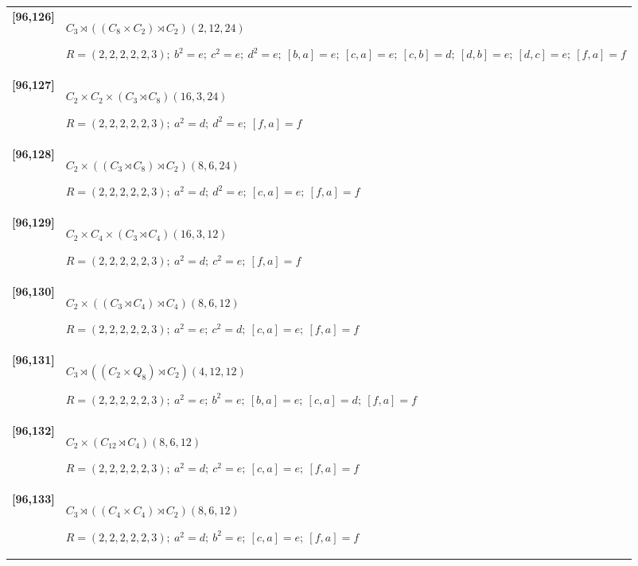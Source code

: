 \documentclass[UTF8,fontset=fandol,11pt,a4paper]{ctexart}
\begin{document}
\begin{longtable}{@{}p{17mm}>{\raggedright\arraybackslash}p{141mm}@{}}
\textbf{[96,126]} & $C_{3}\rtimes ((C_{8}\times C_{2})\rtimes C_{2})$\quad $(2,12,24)$\par\(R=(2,2,2,2,2,3);\allowbreak\ b^{2}=e;\allowbreak\ c^{2}=e;\allowbreak\ d^{2}=e;\allowbreak\ [b,a]=e;\allowbreak\ [c,a]=e;\allowbreak\ [c,b]=d;\allowbreak\ [d,b]=e;\allowbreak\ [d,c]=e;\allowbreak\ [f,a]=f\)\\[3pt]

\textbf{[96,127]} & $C_{2}\times C_{2}\times (C_{3}\rtimes C_{8})$\quad $(16,3,24)$\par\(R=(2,2,2,2,2,3);\allowbreak\ a^{2}=d;\allowbreak\ d^{2}=e;\allowbreak\ [f,a]=f\)\\[3pt]

\textbf{[96,128]} & $C_{2}\times ((C_{3}\rtimes C_{8})\rtimes C_{2})$\quad $(8,6,24)$\par\(R=(2,2,2,2,2,3);\allowbreak\ a^{2}=d;\allowbreak\ d^{2}=e;\allowbreak\ [c,a]=e;\allowbreak\ [f,a]=f\)\\[3pt]

\textbf{[96,129]} & $C_{2}\times C_{4}\times (C_{3}\rtimes C_{4})$\quad $(16,3,12)$\par\(R=(2,2,2,2,2,3);\allowbreak\ a^{2}=d;\allowbreak\ c^{2}=e;\allowbreak\ [f,a]=f\)\\[3pt]

\textbf{[96,130]} & $C_{2}\times ((C_{3}\rtimes C_{4})\rtimes C_{4})$\quad $(8,6,12)$\par\(R=(2,2,2,2,2,3);\allowbreak\ a^{2}=e;\allowbreak\ c^{2}=d;\allowbreak\ [c,a]=e;\allowbreak\ [f,a]=f\)\\[3pt]

\textbf{[96,131]} & $C_{3}\rtimes ((C_{2}\times Q_{8})\rtimes C_{2})$\quad $(4,12,12)$\par\(R=(2,2,2,2,2,3);\allowbreak\ a^{2}=e;\allowbreak\ b^{2}=e;\allowbreak\ [b,a]=e;\allowbreak\ [c,a]=d;\allowbreak\ [f,a]=f\)\\[3pt]

\textbf{[96,132]} & $C_{2}\times (C_{12}\rtimes C_{4})$\quad $(8,6,12)$\par\(R=(2,2,2,2,2,3);\allowbreak\ a^{2}=d;\allowbreak\ c^{2}=e;\allowbreak\ [c,a]=e;\allowbreak\ [f,a]=f\)\\[3pt]

\textbf{[96,133]} & $C_{3}\rtimes ((C_{4}\times C_{4})\rtimes C_{2})$\quad $(8,6,12)$\par\(R=(2,2,2,2,2,3);\allowbreak\ a^{2}=d;\allowbreak\ b^{2}=e;\allowbreak\ [c,a]=e;\allowbreak\ [f,a]=f\)\\[3pt]


\end{longtable}
\end{document}

